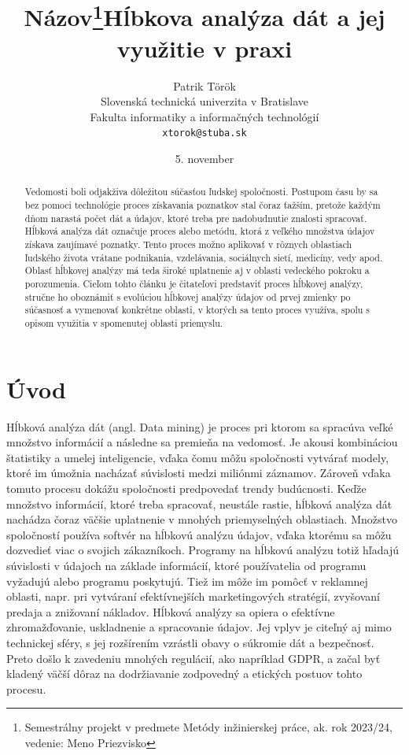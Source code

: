 \documentclass[10pt,twoside,slovak,a4paper]{article}
\title{Názov\thanks{Semestrálny projekt v predmete Metódy inžinierskej práce, ak. rok 2023/24, vedenie: Meno Priezvisko}} %
\title{Hĺbkova analýza dát a jej využitie v praxi}
\author{Patrik Török\\[2pt]
	{\small Slovenská technická univerzita v Bratislave}\\
	{\small Fakulta informatiky a informačných technológií}\\
	{\small \texttt{xtorok@stuba.sk}}
	}
\date{\small 5. november }
\begin{document}
\maketitle

\begin{abstract}
Vedomosti boli odjakživa dôležitou súčasťou ľudskej spoločnosti. Postupom času by sa bez pomoci technológie proces získavania poznatkov stal čoraz ťažším, pretože každým dňom narastá počet dát a údajov, ktoré treba pre nadobudnutie znalosti spracovať. Hĺbková analýza dát označuje proces alebo metódu, ktorá z veľkého množstva údajov získava zaujímavé poznatky. Tento proces možno aplikovať v rôznych oblastiach ľudského života vrátane podnikania, vzdelávania, sociálnych sietí, medicíny, vedy apod. Oblasť hĺbkovej analýzy má teda široké uplatnenie aj v oblasti vedeckého pokroku a porozumenia. Cieľom tohto článku je čitateľovi predstaviť proces hĺbkovej analýzy, stručne ho oboznámiť s evolúciou hĺbkovej analýzy údajov od prvej zmienky po súčasnosť a vymenovať konkrétne oblasti, v ktorých sa tento proces využíva, spolu s opisom využitia v spomenutej oblasti priemyslu. 
\end{abstract}



\section{Úvod}
Hĺbková analýza dát (angl. Data mining) je proces pri ktorom sa spracúva veľké množstvo informácií a následne sa premieňa na vedomosť\cite{Iberdola}. Je akousi kombináciou štatistiky a umelej inteligencie, vďaka čomu môžu spoločnosti vytvárať modely, ktoré im úmožnia nacházať súvislosti medzi miliónmi záznamov. Zároveň vďaka tomuto procesu dokážu spoločnosti predpovedať trendy budúcnosti. Keďže množstvo informácií, ktoré treba spracovať, neustále rastie,  hĺbková analýza dát nachádza čoraz väčšie uplatnenie v mnohých priemyselných oblastiach. Množstvo spoločností používa softvér na hĺbkovú analýzu údajov, vďaka ktorému sa môžu dozvedieť viac o svojich zákazníkoch. Programy na hĺbkovú analýzu totiž hľadajú súvislosti v údajoch na základe informácií, ktoré používatelia od programu vyžadujú alebo programu poskytujú. Tiež im môže im pomôcť v reklamnej oblasti, napr. pri vytváraní efektívnejších marketingových stratégií, zvyšovaní predaja a znižovaní nákladov.\cite{Bidgoli:HTM} Hĺbková analýzy sa opiera o efektívne zhromažďovanie, uskladnenie a spracovanie údajov. Jej vplyv je citeľný aj mimo technickej sféry, s jej rozšírením vzrástli obavy o súkromie dát a bezpečnosť. Preto došlo k zavedeniu mnohých regulácií, ako napríklad GDPR, a začal byť kladený väčší dôraz na dodržiavanie zodpovedný a etických postuov tohto procesu.
\end{document}
